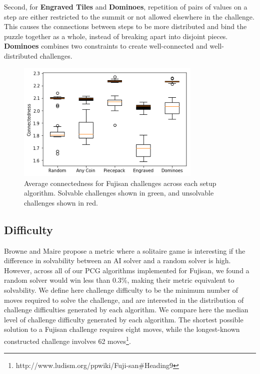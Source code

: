 \documentclass[10pt,journal,compsoc]{IEEEtran}
\begin{document}
Second, for {\bf Engraved Tiles} and {\bf Dominoes}, repetition of pairs of values on a step are either restricted to the summit or not allowed elsewhere in the challenge. This causes the connections between steps to be more distributed and bind the puzzle together as a whole, instead of breaking apart into disjoint pieces. {\bf Dominoes} combines two constraints to create well-connected and well-distributed challenges.

\begin{figure}[t]
\includegraphics[width=8.8cm]{graphics/connectedness.png}
\caption{Average connectedness for Fujisan challenges across each setup algorithm. 
Solvable challenges shown in green, and unsolvable challenges shown in red.}
\label{fig:connected}
\end{figure}


\subsection{Difficulty}

Browne and Maire \cite{MCPUZZLE} propose a metric where a solitaire game is interesting if the difference in solvability between an AI solver and a random solver is high. However, across all of our PCG algorithms implemented for Fujisan, we found a random solver would win less than 0.3\%, making their metric equivalent to solvability. We define here challenge difficulty to be the minimum number of moves required to solve the challenge, and are interested in the distribution of challenge difficulties generated by each algorithm. We compare here the median level of challenge difficulty generated by each algorithm. The shortest possible solution to a Fujisan challenge requires eight moves, while 
the longest-known constructed challenge involves 62 moves\footnote{http://www.ludism.org/ppwiki/Fuji-san\#Heading9}.
\end{document}
